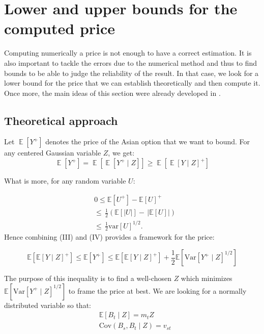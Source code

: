 \documentclass{article}
\begin{document}
\section{Lower and upper bounds for the computed price}

Computing numerically a price is not enough to have a correct estimation. It is also important to tackle the errors
due to the numerical method and thus to find bounds to be able to judge the reliability of the result.
In that case, we look for a lower bound for the price that we can establish theoretically and then compute it.
Once more, the main ideas of this section were already developed in \cite{Rogers}.

\subsection{Theoretical approach}
Let $\operatorname{\mathbb{E}}[Y^{+}]$ denotes the price of the Asian option that we want to bound. For any centered Gaussian variable $Z$, we get:
\begin{equation}
\operatorname{\mathbb{E}}[Y^{+}]=\operatorname{\mathbb{E}}[\operatorname{\mathbb{E}}[Y^{+}\mid Z]]\geq\operatorname{\mathbb{E}}\left[\operatorname{\mathbb{E}}[Y\mid Z]^{+}\right]
\tag{III}
\end{equation}
 
What is more, for any random variable $U$:

 \begin{equation}
    \begin{aligned}
    &0\leq \mathbb{E}[U^{+}]-\mathbb{E}[U]^{+} \\ 
    &{{\leq\,\frac{1}{2}(\mathbb{E}[|U|]-\,|\mathbb{E}[U]|)}}\\ 
    &{{\leq\,\frac{1}{2}\mathrm{var}[U]^{1/2}.}}
    \end{aligned}
    \tag{IV}
 \end{equation}
 Hence combining (III) and (IV) provides a framework for the price:

\[
\mathbb{E}[\mathbb{E}[Y\mid Z]^{+}]\leq \mathbb{E}[Y^{+}] \leq \mathbb{E}[\mathbb{E}[Y\mid Z]^{+}] + \frac{1}{2}\mathbb{E}[\mathrm{Var}[Y^{+}\mid Z]^{1/2}]
\]

The purpose of this inequality is to find a well-chosen $Z$ which minimizes $\mathbb{E}[\mathrm{Var}[Y^{+}\mid Z]^{1/2}]$ to frame the price at best. We are looking for a normally distributed variable so that:
\begin{align*}
  &\mathbb{E}[B_t\mid Z]=m_{t}Z\\
  &\mathrm{Cov}(B_s,B_t\mid Z)=v_{st} 
\end{align*}
\end{document}
